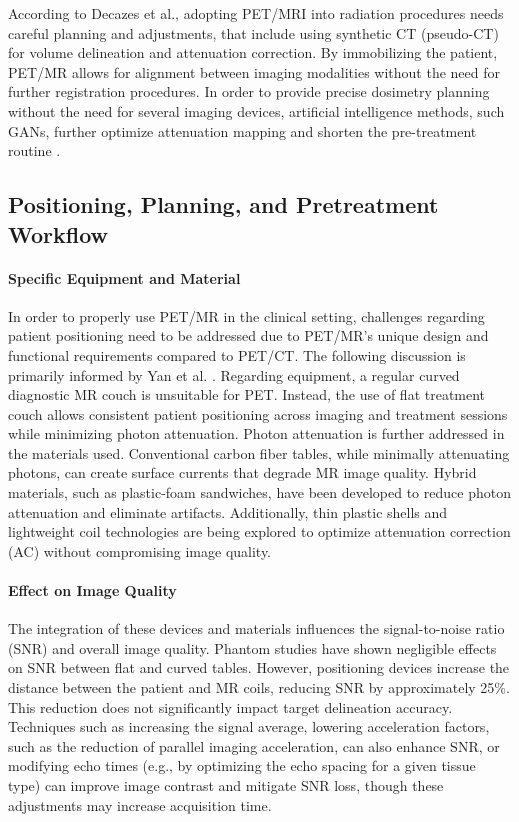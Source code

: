 \begin{multicols}{2}

According to Decazes et al., adopting PET/MRI into radiation procedures needs careful planning and adjustments, that include using synthetic CT (pseudo-CT) for volume delineation and attenuation correction. %
By immobilizing the patient, PET/MR allows for alignment between imaging modalities without the need for further registration procedures. In order to provide precise dosimetry planning without the need for several imaging devices, artificial intelligence methods, such GANs, further optimize attenuation mapping and shorten the pre-treatment routine \cite{decazes2021}.


\subsection{Positioning, Planning, and Pretreatment Workflow}

\paragraph{Specific Equipment and Material}
In order to properly use PET/MR in the clinical setting, challenges regarding patient positioning need to be addressed due to PET/MR's  unique design and functional requirements compared to PET/CT. The following discussion is primarily informed by Yan et al. \cite{yan2024}.
Regarding equipment, a regular curved diagnostic MR couch is unsuitable for PET. Instead, the use of flat treatment couch allows consistent patient positioning across imaging and treatment sessions while minimizing photon attenuation. Photon attenuation is further addressed in the materials used. Conventional carbon fiber tables, while minimally attenuating photons, can create surface currents that degrade MR image quality. Hybrid materials, such as plastic-foam sandwiches, have been developed to reduce photon attenuation and eliminate artifacts. Additionally, thin plastic shells and lightweight coil technologies are being explored to optimize attenuation correction (AC) without compromising image quality. \cite{yan2024, ziegler2013}

\paragraph{Effect on Image Quality}
The integration of these devices and materials influences the signal-to-noise ratio (SNR) and overall image quality. Phantom studies have shown negligible effects on SNR between flat and curved tables. However, positioning devices increase the distance between the patient and MR coils, reducing SNR by approximately 25\%. This reduction does not significantly impact target delineation accuracy. Techniques such as increasing the signal average, lowering acceleration factors, such as the reduction of parallel imaging acceleration, can also enhance SNR, or modifying echo times (e.g., by optimizing the echo spacing for a given tissue type) can improve image contrast and mitigate SNR loss, though these adjustments may increase acquisition time. \cite{yan2024,Rostami2024}


\end{multicols}
